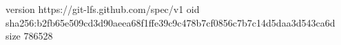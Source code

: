 version https://git-lfs.github.com/spec/v1
oid sha256:b2fb65e509cd3d90aeea68f1ffe39c9c478b7cf0856c7b7c14d5daa3d543ca6d
size 786528
